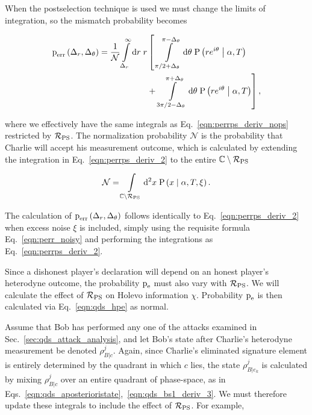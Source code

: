 \noindent When the postselection technique is used we must change the limits of integration, so the mismatch probability becomes

\begin{align}\label{eqn:perrps_deriv_2}
\perr\left(\Delta_r, \Delta_\theta\right) %
= \frac{1}{\mathcal{N}} \int\limits_{\Delta_r}^{\infty} \mathrm{d}r \; r &\left[ \; \int\limits_{ \pi/2 + \Delta_\theta}^{\pi - \Delta_\theta} \mathrm{d}\theta \; \text{P}\left(r e^{i \theta} \given \alpha, T\right) \right. \notag \\
%
 &+ \left. \int\limits_{3 \pi/2 - \Delta_\theta}^{\pi + \Delta_\theta} \mathrm{d}\theta \; \text{P}\left(r e^{i \theta} \given \alpha, T\right) \right],
\end{align}


\noindent where we effectively have the same integrals as Eq.~\ref{eqn:perrps_deriv_nops} restricted by $\mathcal{R}_{\text{PS}}$. The normalization probability $\mathcal{N}$ is the probability that Charlie will accept his measurement outcome, which is calculated by extending the integration in Eq.~\ref{eqn:perrps_deriv_2} to the entire $\mathbb{C} \setminus \mathcal{R}_{\text{PS}}$

\begin{equation}\label{eqn:qds_perrps_normalization}
\mathcal{N} = \int\limits_{\mathbb{C} \setminus \mathcal{R}_{\text{PS}}} \mathop{}\!\mathrm{d^2} x \; \text{P}\left(x \; \middle| \; \alpha, T, \xi \right).
\end{equation}

\noindent The calculation of $\text{p}_{\text{err}}\left(\Delta_r, \Delta_\theta\right)$ follows identically to Eq.~\ref{eqn:perrps_deriv_2} when excess noise $\xi$ is included, simply using the requisite formula Eq.~\ref{eqn:perr_noisy} and performing the integrations as Eq.~\ref{eqn:perrps_deriv_2}.


Since a dishonest player's declaration will depend on an honest player's heterodyne outcome, the probability $\text{p}_{\text{e}}$ must also vary with $\mathcal{R}_{\text{PS}}$. We will calculate the effect of $\mathcal{R}_{\text{PS}}$ on Holevo information $\chi$. Probability $\text{p}_{\text{e}}$ is then calculated via Eq.~\ref{eqn:qds_hpe} as normal.

Assume that Bob has performed any one of the attacks examined in Sec.~\ref{sec:qds_attack_analysis}, and let Bob's state after Charlie's heterodyne measurement be denoted $\rho_{B | c}^j$. Again, since Charlie's eliminated signature element is entirely determined by the quadrant in which $c$ lies, the state $\rho_{B | e_k}^j$ is calculated by mixing $\rho_{B | c}^j$ over an entire quadrant of phase-space, as in Eqs.~\ref{eqn:qds_aposterioristate},~\ref{eqn:qds_bs1_deriv_3}. We must therefore update these integrals to include the effect of $\mathcal{R}_{\text{PS}}$. For example,

